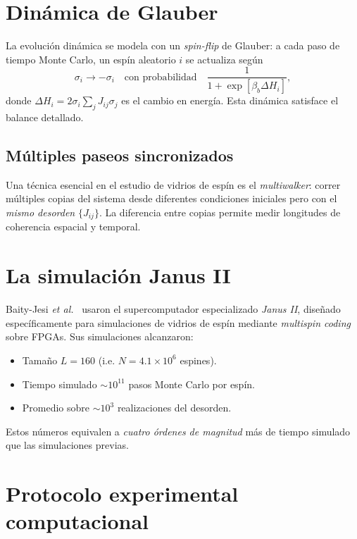 \section{Dinámica de Glauber}

La evolución dinámica se modela con un \emph{spin-flip} de Glauber: a cada paso 
de tiempo Monte Carlo, un espín aleatorio $i$ se actualiza según
\begin{equation}
    \sigma_{i} \to -\sigma_{i} \quad \text{con probabilidad} \quad 
    \frac{1}{1 + \exp[\beta_{b} \Delta H_{i}]},
    \label{eq:glauber_flip}
\end{equation}
%
donde $\Delta H_{i} = 2 \sigma_{i} \sum_{j} J_{ij} \sigma_{j}$ es el cambio en 
energía. Esta dinámica satisface el balance detallado.

\subsection{Múltiples paseos sincronizados}

Una técnica esencial en el estudio de vidrios de espín es el \emph{multiwalker}: 
correr múltiples copias del sistema desde diferentes condiciones iniciales pero 
con el \emph{mismo desorden} $\{J_{ij}\}$. La diferencia entre copias permite 
medir longitudes de coherencia espacial y temporal.

\section{La simulación Janus II}

Baity-Jesi \emph{et al.}~\cite{baityjesi2019} usaron el supercomputador especializado 
\emph{Janus II}, diseñado específicamente para simulaciones de vidrios de espín 
mediante \emph{multispin coding} sobre FPGAs. Sus simulaciones alcanzaron:
\begin{itemize}
\item Tamaño $L = 160$ (i.e. $N = 4.1 \times 10^{6}$ espines).
\item Tiempo simulado $\sim 10^{11}$ pasos Monte Carlo por espín.
\item Promedio sobre $\sim 10^{3}$ realizaciones del desorden.
\end{itemize}

\noindent Estos números equivalen a \emph{cuatro órdenes de magnitud} más de 
tiempo simulado que las simulaciones previas.

\section{Protocolo experimental computacional}

